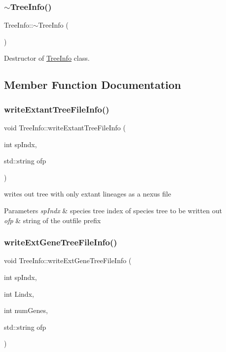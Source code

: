 \subsubsection{\texorpdfstring{$\sim$TreeInfo()}{~TreeInfo()}}
{\footnotesize\ttfamily Tree\+Info\+::$\sim$\+Tree\+Info (\begin{DoxyParamCaption}{ }\end{DoxyParamCaption})}



Destructor of \mbox{\hyperlink{class_tree_info}{Tree\+Info}} class. 



\subsection{Member Function Documentation}
\mbox{\label{class_tree_info_aabdbd68d218fcdd3b4e9d9044393123f}} 
\subsubsection{\texorpdfstring{writeExtantTreeFileInfo()}{writeExtantTreeFileInfo()}}
{\footnotesize\ttfamily void Tree\+Info\+::write\+Extant\+Tree\+File\+Info (\begin{DoxyParamCaption}\item[{int}]{sp\+Indx,  }\item[{std\+::string}]{ofp }\end{DoxyParamCaption})}



writes out tree with only extant lineages as a nexus file 


\begin{DoxyParams}{Parameters}
{\em sp\+Indx} & species tree index of species tree to be written out \\
\hline
{\em ofp} & string of the outfile prefix \\
\hline
\end{DoxyParams}
\mbox{\label{class_tree_info_adcbbda0e1deadd68ae4f19d44a42b173}} 
\subsubsection{\texorpdfstring{writeExtGeneTreeFileInfo()}{writeExtGeneTreeFileInfo()}}
{\footnotesize\ttfamily void Tree\+Info\+::write\+Ext\+Gene\+Tree\+File\+Info (\begin{DoxyParamCaption}\item[{int}]{sp\+Indx,  }\item[{int}]{Lindx,  }\item[{int}]{num\+Genes,  }\item[{std\+::string}]{ofp }\end{DoxyParamCaption})}



